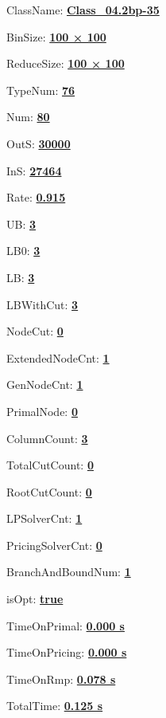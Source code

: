 \documentclass[11pt]{article}
\begin{document}
\pagestyle{empty}


ClassName: \underline{\textbf{Class_04.2bp-35}}
\par
BinSize: \underline{\textbf{100 × 100}}
\par
ReduceSize: \underline{\textbf{100 × 100}}
\par
TypeNum: \underline{\textbf{76}}
\par
Num: \underline{\textbf{80}}
\par
OutS: \underline{\textbf{30000}}
\par
InS: \underline{\textbf{27464}}
\par
Rate: \underline{\textbf{0.915}}
\par
UB: \underline{\textbf{3}}
\par
LB0: \underline{\textbf{3}}
\par
LB: \underline{\textbf{3}}
\par
LBWithCut: \underline{\textbf{3}}
\par
NodeCut: \underline{\textbf{0}}
\par
ExtendedNodeCnt: \underline{\textbf{1}}
\par
GenNodeCnt: \underline{\textbf{1}}
\par
PrimalNode: \underline{\textbf{0}}
\par
ColumnCount: \underline{\textbf{3}}
\par
TotalCutCount: \underline{\textbf{0}}
\par
RootCutCount: \underline{\textbf{0}}
\par
LPSolverCnt: \underline{\textbf{1}}
\par
PricingSolverCnt: \underline{\textbf{0}}
\par
BranchAndBoundNum: \underline{\textbf{1}}
\par
isOpt: \underline{\textbf{true}}
\par
TimeOnPrimal: \underline{\textbf{0.000 s}}
\par
TimeOnPricing: \underline{\textbf{0.000 s}}
\par
TimeOnRmp: \underline{\textbf{0.078 s}}
\par
TotalTime: \underline{\textbf{0.125 s}}
\par
\newpage
\end{document}
